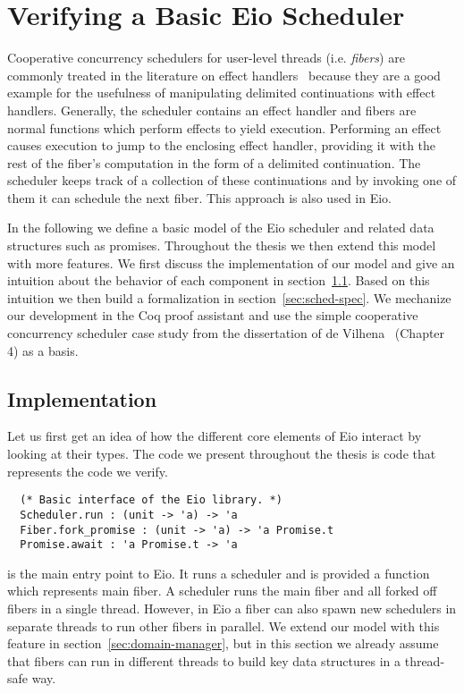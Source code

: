 \section{Verifying a Basic Eio Scheduler}
\label{sec:scheduler}

Cooperative concurrency schedulers for user-level threads (i.e. \emph{fibers}) are commonly treated in the literature
on effect handlers~\cite{dolan2018concurrent,leijen2017structured,de2021separation} because they are a good example for the usefulness
of manipulating delimited continuations with effect handlers.
Generally, the scheduler contains an effect handler and fibers are normal functions which perform effects to yield execution.
Performing an effect causes execution to jump to the enclosing effect handler, providing it with the rest of the fiber's computation in the form of a delimited continuation.
The scheduler keeps track of a collection of these continuations and by invoking one of them it can schedule the next fiber.
This approach is also used in Eio.

In the following we define a basic model of the Eio scheduler and related data structures such as promises.
Throughout the thesis we then extend this model with more features.
We first discuss the implementation of our model and give an intuition about the behavior of each component in section~\ref{sec:sched-impl}.
Based on this intuition we then build a formalization in section~\ref{sec:sched-spec}.
We mechanize our development in the Coq proof assistant and use the simple cooperative concurrency scheduler case study from the dissertation of de Vilhena~\cite{de2022proof} (Chapter 4) as a basis.

\subsection{Implementation}
\label{sec:sched-impl}

Let us first get an idea of how the different core elements of Eio interact by looking at their types.
The code we present throughout the thesis is \ocf{} code that represents the \hh{} code we verify.

\begin{verbatim}
  (* Basic interface of the Eio library. *)
  Scheduler.run : (unit -> 'a) -> 'a
  Fiber.fork_promise : (unit -> 'a) -> 'a Promise.t
  Promise.await : 'a Promise.t -> 'a
\end{verbatim}

 is the main entry point to Eio.
It runs a scheduler and is provided a function which represents main fiber.
A scheduler runs the main fiber and all forked off fibers in a single thread.
However, in Eio a fiber can also spawn new schedulers in separate threads to run other fibers in parallel.
We extend our model with this feature in section~\ref{sec:domain-manager}, but in this section we already assume that fibers can run in different threads to build key data structures in a thread-safe way.

